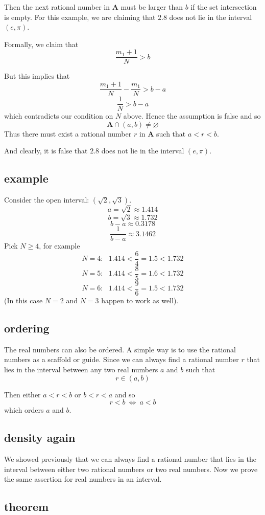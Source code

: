 \documentclass[11pt, oneside]{article}
\begin{document}
Then the next rational number in $\mathbf{A}$ must be larger than $b$ if the set intersection is empty.  For this example, we are claiming that $2.8$ does not lie in the interval $(e, \pi)$.

Formally, we claim that
\[ \frac{m_1 + 1}{N} > b \]

But this implies that
\[ \frac{m_1 + 1}{N} - \frac{m_1}{N} > b - a \]
\[ \frac{1}{N} > b - a \]
which contradicts our condition on $N$ above.  Hence the assumption is false and so
\[ \mathbf{A} \cap (a,b) \ne \varnothing \]
Thus there must exist a rational number $r$ in $\mathbf{A}$ such that $a < r < b$.

And clearly, it is false that $2.8$ does not lie in the interval $(e, \pi)$.

\subsection*{example}

Consider the open interval:  $(\sqrt{2},\sqrt{3})$.  
\[ a = \sqrt{2} \approx 1.414 \]
\[ b = \sqrt{3} \approx 1.732 \]
\[ b-a \approx 0.3178 \]
\[ \frac{1}{b-a} \approx 3.1462 \]
Pick $N \ge 4$, for example
\[ N = 4: \ \ \  1.414 < \frac{6}{4} = 1.5 < 1.732 \]
\[ N = 5: \ \ \  1.414 < \frac{8}{5} = 1.6 < 1.732 \]
\[ N = 6: \ \ \  1.414 < \frac{9}{6} = 1.5 < 1.732 \]
(In this case $N=2$ and $N=3$ happen to work as well).

\subsection*{ordering}
The real numbers can also be ordered.  A simple way is to use the rational numbers as a scaffold or guide.  Since we can always find a rational number $r$ that lies in the interval between any two real numbers $a$ and $b$ such that 
\[ r \in (a,b) \]

Then either $a < r < b$ or $b < r < a$ and so
\[ r < b \ \iff \ a < b \]
which orders $a$ and $b$.

\subsection*{density again}
We showed previously that we can always find a rational number that lies in the interval between either two rational numbers or two real numbers.  Now we prove the same assertion for real numbers in an interval.

\subsection*{theorem}
\end{document}
